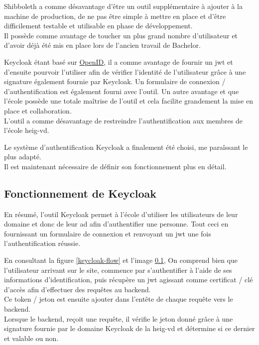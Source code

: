 \documentclass[
    iai, %
    il, %
]{heig-tb}
\begin{document}
Shibboleth a comme désavantage d'être un outil supplémentaire à ajouter à la machine de production, de ne pas être simple à mettre en place et d'être difficilement testable et utilisable en phase de développement. \\
Il possède comme avantage de toucher un plus grand nombre d'utilisateur et d'avoir déjà été mis en place lors de l'ancien travail de Bachelor.

Keycloak étant basé sur \href{https://openid.net/connect/}{OpenID}, il a comme avantage de fournir un \Gls{jwt} et d'ensuite pourvoir l'utiliser afin de vérifier l'identité de l'utilisateur grâce à une signature également fournie par Keycloak. Un formulaire de connexion / d'authentification est également fourni avec l'outil. Un autre avantage et que l'école possède une totale maîtrise de l'outil et cela facilite grandement la mise en place et collaboration. \\
L'outil a comme désavantage de restreindre l'authentification aux membres de l'école \Gls{heig-vd}.


Le système d'authentification Keycloak a finalement été choisi, me paraîssant le plus adapté. \\
Il est maintenant nécessaire de définir son fonctionnement plus en détail.

\subsection{Fonctionnement de Keycloak}
En résumé, l'outil Keycloak permet à l'école d'utiliser les utilisateurs de leur domaine et donc de leur \Gls{ad} afin d'authentifier une personne. Tout ceci en fournissant un formulaire de connexion et renvoyant un \Gls{jwt} une fois l'authentification réussie.

En consultant la figure \ref{keycloak-flow} et l'image \ref{}, On comprend bien que l'utilisateur arrivant sur le site, commence par s'authentifier à l'aide de ses informations d'identification, puis récupère un \Gls{jwt} agissant comme certificat / clé d'accès afin d'effectuer des requêtes au \Gls{backend}. \\
Ce token / jeton est ensuite ajouter dans l'entête de chaque requête vers le \Gls{backend}. \\
Lorsque le \Gls{backend}, reçoit une requête, il vérifie le jeton donné grâce à une signature fournie par le domaine Keycloak de la \Gls{heig-vd} et détermine si ce dernier et valable ou non.
\end{document}
